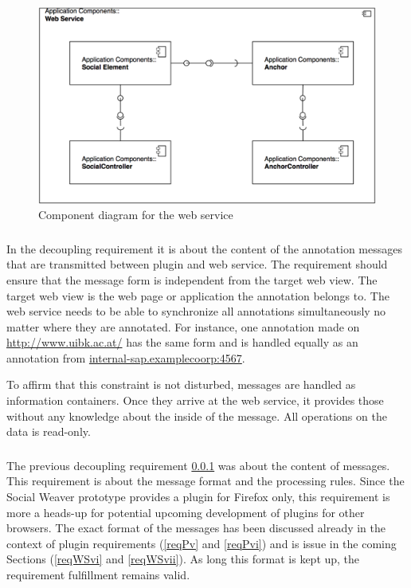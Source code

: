 \begin{figure}
	\includegraphics[width=13cm]{images/component-server-diagram.png}
	\caption{Component diagram for the web service}
	\label{component-server-diagram}
\end{figure}

\subsubsection[Decoupling Web Service and Target Web View]{\reqWSiv}\label{reqWSiv}
In the decoupling requirement it is about the content of the annotation messages that are transmitted between plugin and web service. The requirement should ensure that the message form is independent from the target web view. The target web view is the web page or application the annotation belongs to. 
The web service needs to be able to synchronize all annotations simultaneously no matter where they are annotated. For instance, one annotation made on \url{http://www.uibk.ac.at/} has the same form and is handled equally as an annotation from \url{internal-sap.examplecoorp:4567}. 

To affirm that this constraint is not disturbed, messages are handled as information containers. Once they arrive at the web service, it provides those without any knowledge about the inside of the message. All operations on the data is read-only. 

\subsubsection[Decoupling Web Service and Plugin]{\reqWSv}\label{reqWSv}

The previous decoupling requirement \ref{reqWSiv} was about the content of messages. This requirement is about the message format and the processing rules. Since the Social Weaver prototype provides a plugin for Firefox only, this requirement is more a heads-up for potential upcoming development of plugins for other browsers. 
The exact format of the messages has been discussed already in the context of plugin requirements (\ref{reqPv} and \ref{reqPvi}) and is issue in the coming Sections (\ref{reqWSvi} and \ref{reqWSvii}). As long this format is kept up, the requirement fulfillment remains valid. 

